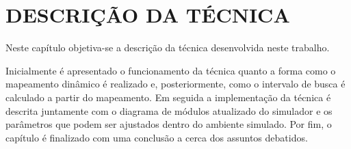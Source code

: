 \chapter{DESCRIÇÃO DA TÉCNICA} \label{cap:tecnica}

Neste capítulo objetiva-se a descrição da técnica desenvolvida neste trabalho.

Inicialmente é apresentado o funcionamento da técnica quanto a forma como o mapeamento dinâmico é realizado e, posteriormente, como o intervalo de busca é calculado a partir do mapeamento. Em seguida a implementação da técnica é descrita juntamente com o diagrama de módulos atualizado do simulador e os parâmetros que podem ser ajustados dentro do ambiente simulado. Por fim, o capítulo é finalizado com uma conclusão a cerca dos assuntos debatidos.





